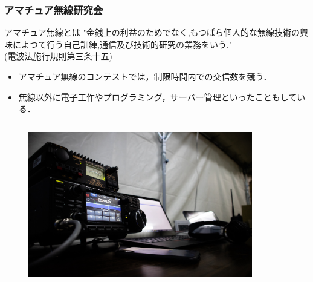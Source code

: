 \begin{frame}
    \frametitle{アマチュア無線研究会}
    \begin{block}{アマチュア無線とは}
        "金銭上の利益のためでなく,もつぱら個人的な無線技術の興味によつて行う自己訓練,通信及び技術的研究の業務をいう."\\
        (電波法施行規則第三条十五)
    \end{block}
    \begin{itemize}
        \item アマチュア無線のコンテストでは，制限時間内での交信数を競う．
        \item 無線以外に電子工作やプログラミング，サーバー管理といったこともしている．
    \end{itemize}
    \begin{columns}
        \begin{column}{0.48\textwidth}
            \begin{figure}[htbp]
                \begin{center}
                    \includegraphics[width=.9\hsize]{pic/pic5.JPG}
                \end{center}
            \end{figure}
        \end{column}
        \begin{column}{0.48\textwidth}
            \begin{figure}[htbp]
                \begin{center}

\end{center}
\end{figure}
\end{column}
\end{columns}
\end{frame}
